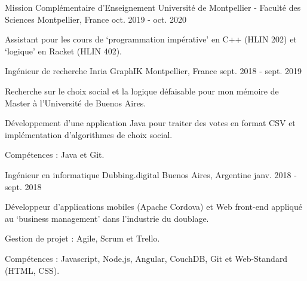 

\begin{cventries}

\cventry
{Mission Complémentaire d'Enseignement} %
{Université de Montpellier - Faculté des Sciences} %
{Montpellier, France} %
{oct. 2019 - oct. 2020} %
{
  \begin{cvitems} %
    \item Assistant pour les cours de `programmation imp\'erative' en C++ (HLIN 202) et `logique' en Racket (HLIN 402).
  \end{cvitems}
}
  
\cventry
{Ingénieur de recherche}
{Inria GraphIK}
{Montpellier, France}
{sept. 2018 - sept. 2019}
{
\begin{cvitems}
\item Recherche sur le choix social et la logique défaisable pour mon mémoire de Master à l'Université de Buenos Aires.
\item Développement d'une application Java pour traiter des votes en format CSV et implémentation d'algorithmes de choix social.
\item Compétences : Java et Git.
\end{cvitems}
}  

\cventry
{Ingénieur en informatique}
{Dubbing.digital}
{Buenos Aires, Argentine}
{janv. 2018 - sept. 2018}
{
\begin{cvitems}
\item Développeur d'applications mobiles (Apache Cordova) et Web front-end appliqué au `business management' dans l'industrie du doublage. 
\item Gestion de projet : Agile, Scrum et Trello.
\item Compétences : Javascript, Node.js, Angular, CouchDB, Git et Web-Standard (HTML, CSS).
\end{cvitems}
} 


\end{cventries}
